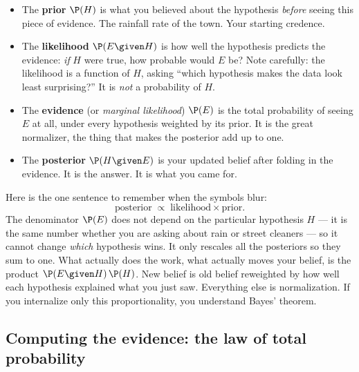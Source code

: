 \begin{itemize}
\item The \textbf{prior} $\P(H)$ is what you believed about the hypothesis \emph{before}
seeing this piece of evidence. The rainfall rate of the town. Your starting credence.
\item The \textbf{likelihood} $\P(E \given H)$ is how well the hypothesis predicts the
evidence: \emph{if} $H$ were true, how probable would $E$ be? Note carefully: the
likelihood is a function of $H$, asking ``which hypothesis makes the data look least
surprising?'' It is \emph{not} a probability of $H$.
\item The \textbf{evidence} (or \emph{marginal likelihood}) $\P(E)$ is the total
probability of seeing $E$ at all, under every hypothesis weighted by its prior. It is
the great normalizer, the thing that makes the posterior add up to one.
\item The \textbf{posterior} $\P(H \given E)$ is your updated belief after folding in the
evidence. It is the answer. It is what you came for.
\end{itemize}

\begin{happeningbox}
Here is the one sentence to remember when the symbols blur:
\[
  \text{posterior} \;\propto\; \text{likelihood} \times \text{prior}.
\]
The denominator $\P(E)$ does not depend on the particular hypothesis $H$ --- it is the
same number whether you are asking about rain or street cleaners --- so it cannot change
\emph{which} hypothesis wins. It only rescales all the posteriors so they sum to one.
What actually does the work, what actually moves your belief, is the product
$\P(E\given H)\,\P(H)$. New belief is old belief reweighted by how well each hypothesis
explained what you just saw. Everything else is normalization. If you internalize only
this proportionality, you understand Bayes' theorem.
\end{happeningbox}

\subsection{Computing the evidence: the law of total probability}

